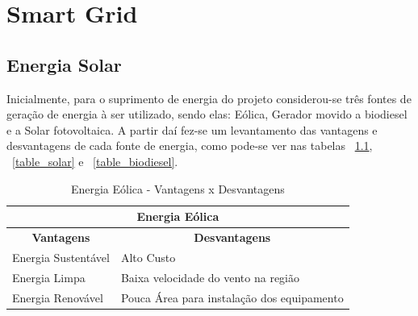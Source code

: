 \chapter[Smart Grid]{Smart Grid}

\section{Energia Solar}
Inicialmente, para o suprimento de energia do projeto considerou-se três fontes de geração de energia à ser utilizado, sendo elas: Eólica, Gerador movido a biodiesel e a Solar fotovoltaica. A partir daí fez-se um levantamento das vantagens e desvantagens de cada fonte de energia, como pode-se ver nas tabelas ~\ref{table_eolica}, ~\ref{table_solar} e ~\ref{table_biodiesel}.

\begin{table}[h]
  \centering
  \caption{Energia Eólica - Vantagens x Desvantagens}
  \label{table_eolica}
  \begin{tabular}{|l|l|}
    \hline
    \multicolumn{2}{|c|}{\textbf{Energia Eólica}}                                         \\ \hline
    \multicolumn{1}{|c|}{\textbf{Vantagens}} & \multicolumn{1}{c|}{\textbf{Desvantagens}} \\ \hline
    Energia Sustentável                      & Alto Custo                                 \\ \hline
    Energia Limpa                            & Baixa velocidade do vento na região        \\ \hline
    Energia Renovável                        & Pouca Área para instalação dos equipamento \\ \hline
  \end{tabular}
\end{table}


